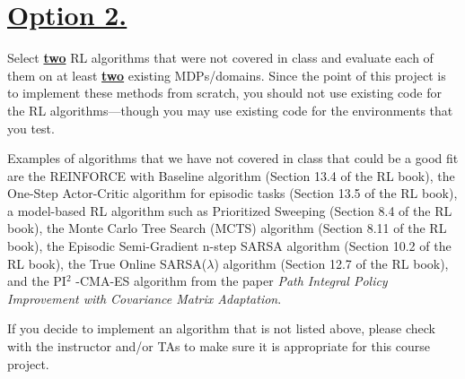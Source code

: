 \documentclass{article}
\newcommand{\POINTS}[1]{\textcolor{purple}{\textbf{{#1}}}}
\begin{document}



\section*{\underline{\textbf{Option 2.}}}

Select \underline{\textbf{two}} RL algorithms that were not covered in class and evaluate each of them on at least \underline{\textbf{two}} existing
MDPs/domains. Since the point of this project is to implement these methods from scratch, you should not use
existing code for the RL algorithms—though you may use existing code for the environments that you test.


\vspace{0.5\baselineskip}

\noindent Examples of algorithms that we have not covered in class that could be a good fit are the REINFORCE with
Baseline algorithm (Section 13.4 of the RL book), the One-Step Actor-Critic algorithm for episodic tasks
(Section 13.5 of the RL book), a model-based RL algorithm such as Prioritized Sweeping (Section 8.4 of the
RL book), the Monte Carlo Tree Search (MCTS) algorithm (Section 8.11 of the RL book), the Episodic
Semi-Gradient n-step SARSA algorithm (Section 10.2 of the RL book), the True Online SARSA($\lambda$) algorithm
(Section 12.7 of the RL book), and the PI$^2$
-CMA-ES algorithm from the paper \textit{Path Integral Policy Improvement
with Covariance Matrix Adaptation}.

\vspace{0.5\baselineskip}

\noindent If you decide to implement an algorithm that is not listed above, please check with the instructor and/or TAs
to make sure it is appropriate for this course project.

\vspace{0.5\baselineskip}
\end{document}
